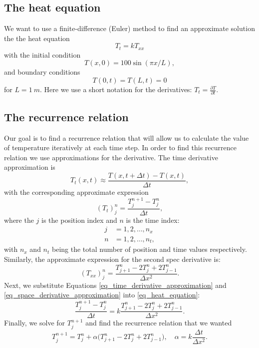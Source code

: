 \subsection{The heat equation}

We want to use a finite-difference (Euler) method to find an approximate solution the the heat equation
\begin{equation}
  T_t = k T_{xx}
  \label{eq_heat_equation}
\end{equation}
with the initial condition
\begin{equation*}
  T(x,0) = 100 \sin(\pi x / L),
\end{equation*}
and boundary conditions
\begin{equation*}
  T(0,t) = T(L,t) = 0
\end{equation*}
for $L = 1 \ m$. Here we use a short notation for the derivatives: $T_t = \frac{\partial T}{\partial t}$.


\subsection{The recurrence relation}

Our goal is to find a recurrence relation that will allow us to calculate the value of temperature iteratively at each time step. In order to find this recurrence relation we use approximations for the derivative. The time derivative approximation is
\[
  T_t(x, t) \approx \frac{T(x, t + \Delta t) - T(x, t)}{\Delta t},
\]
with the corresponding approximate expression
\begin{equation}
  (T_t)_j^n = \frac{T_j^{n + 1} - T_j^{n}}{\Delta t},
  \label{eq_time_derivative_approximation}
\end{equation}
where the $j$ is the position index and $n$ is the time index:
\begin{align*}
  j &= 1, 2, \dots, n_x \\
  n &= 1, 2, \dots, n_t,
\end{align*}
with $n_x$ and $n_t$ being the total number of position and time values respectively.
Similarly, the approximate expression for the second spec derivative is:
\begin{equation}
  (T_{xx})_j^n = \frac{T_{j+1}^n - 2 T_{j}^n + 2T_{j-1}^n}{\Delta x^2}.
  \label{eq_space_derivative_approximation}
\end{equation}
Next, we substitute Equations \ref{eq_time_derivative_approximation} and \ref{eq_space_derivative_approximation} into \autoref{eq_heat_equation}:
\[
  \frac{T_j^{n + 1} - T_j^{n}}{\Delta t} = k \frac{T_{j+1}^n - 2 T_{j}^n + 2T_{j-1}^n}{\Delta x^2}.
\]
Finally, we solve for $T_j^{n + 1}$ and find the recurrence relation that we wanted
\[
  \boxed{ T_j^{n + 1} = T_j^{n} + \alpha \big( T_{j+1}^n - 2 T_{j}^n + 2T_{j-1}^n \big), \quad \alpha = k \frac{\Delta t}{\Delta x^2}. }
\]



